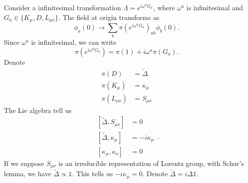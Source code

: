 \documentclass[a4paper,11pt]{article}
\begin{document}
Consider a infinitesimal transformation $\Lambda=e^{i\omega^aG_a}$, where $\omega^a$ is infinitesimal and $G_a\in\{K_\mu,D,L_{\mu\nu}\}$. The field at origin transforms as
\begin{equation}
    \phi_a(0)\rightarrow\sum_b\pi(e^{i\omega^aG_a})_{ab}\phi_b(0).
\end{equation}
Since $\omega^a$ is infinitesimal, we can write
\begin{equation}
    \pi(e^{i\omega^aG_a})=\pi(1)+i\omega^a\pi(G_a).
\end{equation}
Denote
\begin{equation}
\begin{aligned}
\pi(D)&=\tilde{\Delta}\\
\pi(K_\mu)&=\kappa_\mu\\
\pi(L_{\mu\nu})&=S_{\mu\nu}
\end{aligned}
\end{equation}
The Lie algebra tell us
\begin{equation}
\begin{aligned}
\left[\tilde{\Delta},S_{\mu\nu}\right]&=0\\
\left[\tilde{\Delta},\kappa_\mu\right]&=-i\kappa_\mu\\
\left[\kappa_\mu,\kappa_\nu\right]&=0
\end{aligned}.
\end{equation}
If we suppose $S_{\mu\nu}$ is an irreducible representation of Lorentz group, with Schur's lemma, we have $\tilde{\Delta}\propto\mathds{1}$. This tells us $-i\kappa_\mu=0$. Denote $\tilde{\Delta}=i\Delta\mathds{1}$.
\end{document}
